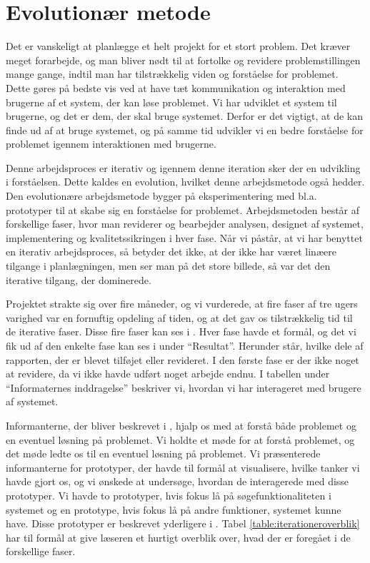 \section{Evolutionær metode}
\label{sec:evolution}

Det er vanskeligt at planlægge et helt projekt for et stort problem. Det kræver meget forarbejde, og man bliver nødt til at fortolke og revidere problemstillingen mange gange, indtil man har tilstrækkelig viden og forståelse for problemet. Dette gøres på bedste vis ved at have tæt kommunikation og interaktion med brugerne af et system, der kan løse problemet. Vi har udviklet et system til brugerne, og det er dem, der skal bruge systemet. Derfor er det vigtigt, at de kan finde ud af at bruge systemet, og på samme tid udvikler vi en bedre forståelse for problemet igennem interaktionen med brugerne. 

Denne arbejdsproces er iterativ og igennem denne iteration sker der en udvikling i forståelsen. Dette kaldes en evolution, hvilket denne arbejdsmetode også hedder. Den evolutionære arbejdsmetode bygger på eksperimentering med bl.a. prototyper til at skabe sig en forståelse for problemet. Arbejdsmetoden består af forskellige faser, hvor man reviderer og bearbejder analysen, designet af systemet, implementering og kvalitetssikringen i hver fase. \cite{cic} Når vi påstår, at vi har benyttet en iterativ arbejdsproces, så betyder det ikke, at der ikke har været linæere tilgange i planlægningen, men ser man på det store billede, så var det den iterative tilgang, der dominerede.

Projektet strakte sig over fire måneder, og vi vurderede, at fire faser af tre ugers varighed var en fornuftig opdeling af tiden, og at det gav os tilstrækkelig tid til de iterative faser. Disse fire faser kan ses i . Hver fase havde et formål, og det vi fik ud af den enkelte fase kan ses i  under ``Resultat''. Herunder står, hvilke dele af rapporten, der er blevet tilføjet eller revideret. I den første fase er der ikke noget at revidere, da vi ikke havde udført noget arbejde endnu. I tabellen under ``Informaternes inddragelse'' beskriver vi, hvordan vi har interageret med brugere af systemet.

Informanterne, der bliver beskrevet i , hjalp os med at forstå både problemet og en eventuel løsning på problemet. Vi holdte et møde for at forstå problemet, og det møde ledte os til en eventuel løsning på problemet. Vi præsenterede informanterne for prototyper, der havde til formål at visualisere, hvilke tanker vi havde gjort os, og vi ønskede at undersøge, hvordan de interagerede med disse prototyper. Vi havde to prototyper, hvis fokus lå på søgefunktionaliteten i systemet og en prototype, hvis fokus lå på andre funktioner, systemet kunne have. Disse prototyper er beskrevet yderligere i . Tabel \ref{table:iterationeroverblik} har til formål at give læseren et hurtigt overblik over, hvad der er foregået i de forskellige faser.



